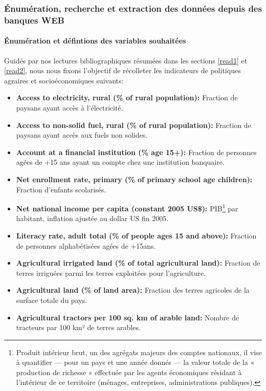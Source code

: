 	\subsubsection{Énumération, recherche et extraction des données depuis des banques WEB}
	\paragraph{Énumération et défintions des variables souhaitées \newline }
	Guidés par nos lectures bibliographiques résumées dans les sections \ref{read1} et \ref{read2}, nous nous fixons l'objectif de récolleter les indicateurs de politiques agraires et socioéconomiques suivants:
	\begin{itemize}
		\item \textbf{ Access to electricity, rural (\% of rural population):} Fraction de paysans ayant accès à l'électricité.
		\item \textbf{ Access to non-solid fuel, rural (\% of rural population):} Fraction de paysans ayant accès aux fuels non solides.
		\item \textbf{ Account at a financial institution (\% age 15+):} Fraction de personnes agées de +15 ans ayant un compte chez une institution banquaire.
		\item \textbf{ Net enrollment rate, primary (\% of primary school age children):} Fraction d'enfants scolarisés.
		\item \textbf{ Net national income per capita (constant 2005 US\$):} PIB\footnote{Produit intérieur brut, un des agrégats majeurs des comptes nationaux, il vise à quantifier — pour un pays et une année donnés — la valeur totale de la « production de richesse » effectuée par les agents économiques résidant à l’intérieur de ce territoire (ménages, entreprises, administrations publiques).} par habitant, inflation ajustée au dollar US fin 2005.
		\item \textbf{ Literacy rate, adult total (\% of people ages 15 and above):} Fraction de personnes alphabétisées agées de +15ans.
		\item \textbf{ Agricultural irrigated land (\% of total agricultural land):} Fraction de terres irriguées parmi les terres exploitées pour l'agriculture.
		\item \textbf{ Agricultural land (\% of land area):} Fraction des terres agricoles de la surface totale du pays.
		\item \textbf{ Agricultural tractors per 100 sq. km of arable land:} Nombre de tracteurs par 100 km² de terres arables.

\end{itemize}
